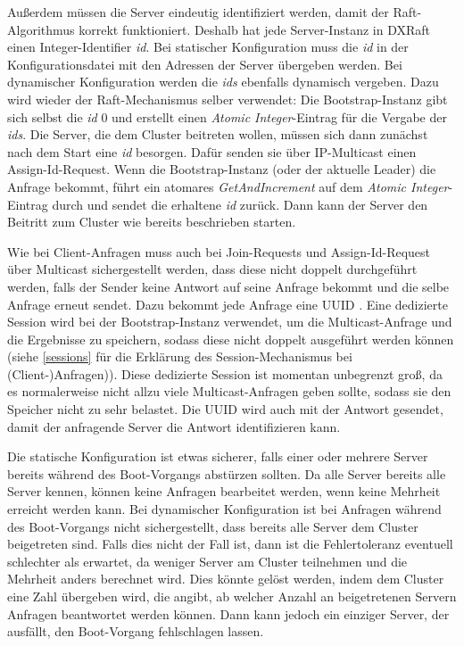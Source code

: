 Außerdem müssen die Server eindeutig identifiziert werden, damit der Raft-Algorithmus korrekt funktioniert. Deshalb hat jede Server-Instanz in DXRaft einen Integer-Identifier \textit{id}. Bei statischer Konfiguration muss die \textit{id} in der Konfigurationsdatei mit den Adressen der Server übergeben werden. Bei dynamischer Konfiguration werden die \textit{ids} ebenfalls dynamisch vergeben. Dazu wird wieder der Raft-Mechanismus selber verwendet: Die Bootstrap-Instanz gibt sich selbst die \textit{id} 0 und erstellt einen \textit{Atomic Integer}-Eintrag für die Vergabe der \textit{ids}. Die Server, die dem Cluster beitreten wollen, müssen sich dann zunächst nach dem Start eine \textit{id} besorgen. Dafür senden sie über IP-Multicast einen Assign-Id-Request. Wenn die Bootstrap-Instanz (oder der aktuelle Leader) die Anfrage bekommt, führt ein atomares \textit{GetAndIncrement} auf dem \textit{Atomic Integer}-Eintrag durch und sendet die erhaltene \textit{id} zurück. Dann kann der Server den Beitritt zum Cluster wie bereits beschrieben starten.

Wie bei Client-Anfragen muss auch bei Join-Requests und Assign-Id-Request über Multicast sichergestellt werden, dass diese nicht doppelt durchgeführt werden, falls der Sender keine Antwort auf seine Anfrage bekommt und die selbe Anfrage erneut sendet. Dazu bekommt jede Anfrage eine UUID \cite{uuid}. Eine dedizierte Session wird bei der Bootstrap-Instanz verwendet, um die Multicast-Anfrage und die Ergebnisse zu speichern, sodass diese nicht doppelt ausgeführt werden können (siehe \ref{sessions} für die Erklärung des Session-Mechanismus bei (Client-)Anfragen)). Diese dedizierte Session ist momentan unbegrenzt groß, da es normalerweise nicht allzu viele Multicast-Anfragen geben sollte, sodass sie den Speicher nicht zu sehr belastet. Die UUID wird auch mit der Antwort gesendet, damit der anfragende Server die Antwort identifizieren kann.

Die statische Konfiguration ist etwas sicherer, falls einer oder mehrere  Server bereits während des Boot-Vorgangs abstürzen sollten. Da alle Server bereits alle Server kennen, können keine Anfragen bearbeitet werden, wenn keine Mehrheit erreicht werden kann. Bei dynamischer Konfiguration ist bei Anfragen während des Boot-Vorgangs nicht sichergestellt, dass bereits alle Server dem Cluster beigetreten sind. Falls dies nicht der Fall ist, dann ist die Fehlertoleranz eventuell schlechter als erwartet, da weniger Server am Cluster teilnehmen und die Mehrheit anders berechnet wird. Dies könnte gelöst werden, indem dem Cluster eine Zahl übergeben wird, die angibt, ab welcher Anzahl an beigetretenen Servern Anfragen beantwortet werden können. Dann kann jedoch ein einziger Server, der ausfällt, den Boot-Vorgang fehlschlagen lassen.

